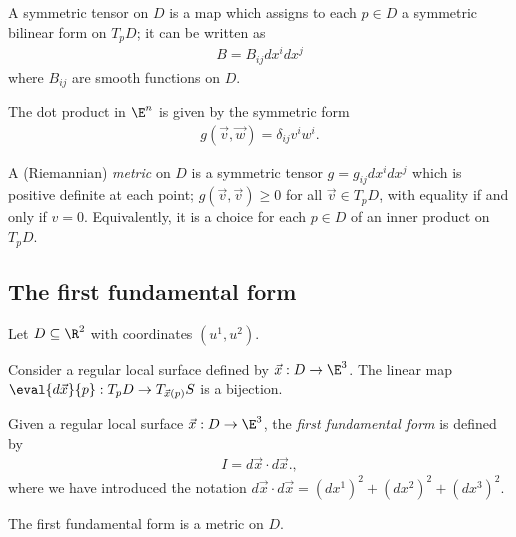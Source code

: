 \documentclass{article}
\begin{document}
\begin{definition}
	A symmetric tensor on $D$ is a map which assigns to each $p\in D$ a symmetric
	bilinear form on $T_pD$; it can be written as
	\begin{align*}
		B=B_{ij}dx^idx^j
	\end{align*}
	where $B_{ij}$ are smooth functions on $D$.
\end{definition}

\begin{corollary}
	The dot product in $\E^n$ is given by the symmetric form
	\begin{align*}
		g(\vec v, \vec w) = \delta_{ij} v^i w^i.
	\end{align*}
\end{corollary}

\begin{definition}
	A (Riemannian) \emph{metric} on $D$ is a symmetric tensor $g=g_{ij}dx^idx^j$
	which is positive definite at each point; $g(\vec v,\vec v)\geq 0$ for all
	$\vec v \in T_pD$, with equality if and only if $v=0$. Equivalently, it is a
	choice for each $p\in D$ of an inner product on $T_pD$.
\end{definition}

\subsection{The first fundamental form}

Let $D\subseteq\R^2$ with coordinates $(u^1,u^2)$.

\begin{proposition}[Notes 7.5]
	Consider a regular local surface defined by $\vec x: D\to \E^3$. The linear map
	$\eval{d\vec x}{p}:T_pD\to T_{\vec x(p)}S$ is a bijection.
\end{proposition}

\begin{definition}
	Given a regular local surface $\vec x: D\to\E^3$, the \emph{first fundamental form}
	is defined by
	\begin{align*}
		I = d\vec x \cdot d\vec x.,
	\end{align*}
	where we have introduced the notation $d\vec x\cdot d\vec x=(dx^1)^2+(dx^2)^2+(dx^3)^2$.
\end{definition}

\begin{proposition}[Notes 7.9]
	The first fundamental form is a metric on $D$.
\end{proposition}
\end{document}
